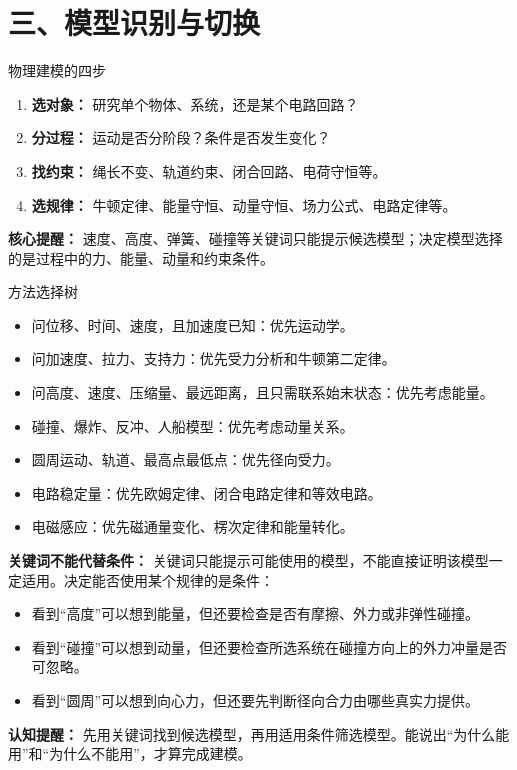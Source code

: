 \section*{三、模型识别与切换}

\begin{conceptbox}{物理建模的四步}

\begin{enumerate}
  \item \textbf{选对象：} 研究单个物体、系统，还是某个电路回路？
  \item \textbf{分过程：} 运动是否分阶段？条件是否发生变化？
  \item \textbf{找约束：} 绳长不变、轨道约束、闭合回路、电荷守恒等。
  \item \textbf{选规律：} 牛顿定律、能量守恒、动量守恒、场力公式、电路定律等。
\end{enumerate}

\textbf{核心提醒：} 速度、高度、弹簧、碰撞等关键词只能提示候选模型；决定模型选择的是过程中的力、能量、动量和约束条件。
\end{conceptbox}

\begin{conceptbox}{方法选择树}

\begin{center}


\label{fig:method-decision-tree}
\end{center}

\begin{itemize}
  \item 问位移、时间、速度，且加速度已知：优先运动学。
  \item 问加速度、拉力、支持力：优先受力分析和牛顿第二定律。
  \item 问高度、速度、压缩量、最远距离，且只需联系始末状态：优先考虑能量。
  \item 碰撞、爆炸、反冲、人船模型：优先考虑动量关系。
  \item 圆周运动、轨道、最高点最低点：优先径向受力。
  \item 电路稳定量：优先欧姆定律、闭合电路定律和等效电路。
  \item 电磁感应：优先磁通量变化、楞次定律和能量转化。
\end{itemize}

\textbf{关键词不能代替条件：} 关键词只能提示可能使用的模型，不能直接证明该模型一定适用。决定能否使用某个规律的是条件：
\begin{itemize}
  \item 看到“高度”可以想到能量，但还要检查是否有摩擦、外力或非弹性碰撞。
  \item 看到“碰撞”可以想到动量，但还要检查所选系统在碰撞方向上的外力冲量是否可忽略。
  \item 看到“圆周”可以想到向心力，但还要先判断径向合力由哪些真实力提供。
\end{itemize}

\textbf{认知提醒：} 先用关键词找到候选模型，再用适用条件筛选模型。能说出“为什么能用”和“为什么不能用”，才算完成建模。
\end{conceptbox}

